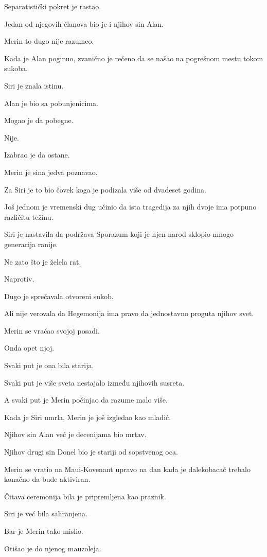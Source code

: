 \bigskip

Separatistički pokret je rastao.

Jedan od njegovih članova bio je i njihov sin Alan.

Merin to dugo nije razumeo.

Kada je Alan poginuo, zvanično je rečeno da se našao na pogrešnom mestu tokom sukoba.

Siri je znala istinu.

Alan je bio sa pobunjenicima.

Mogao je da pobegne.

Nije.

Izabrao je da ostane.

Merin je sina jedva poznavao.

Za Siri je to bio čovek koga je podizala više od dvadeset godina.

Još jednom je vremenski dug učinio da ista tragedija za njih dvoje ima potpuno različitu težinu.

Siri je nastavila da podržava Sporazum koji je njen narod sklopio mnogo generacija ranije.

Ne zato što je želela rat.

Naprotiv.

Dugo je sprečavala otvoreni sukob.

Ali nije verovala da Hegemonija ima pravo da jednostavno proguta njihov svet.

Merin se vraćao svojoj posadi.

Onda opet njoj.

Svaki put je ona bila starija.

Svaki put je više sveta nestajalo između njihovih susreta.

A svaki put je Merin počinjao da razume malo više.

\bigskip

Kada je Siri umrla, Merin je još izgledao kao mladić.

Njihov sin Alan već je decenijama bio mrtav.

Njihov drugi sin Donel bio je stariji od sopstvenog oca.

Merin se vratio na Maui-Kovenant upravo na dan kada je dalekobacač trebalo konačno da bude aktiviran.

Čitava ceremonija bila je pripremljena kao praznik.

Siri je već bila sahranjena.

Bar je Merin tako mislio.

Otišao je do njenog mauzoleja.

